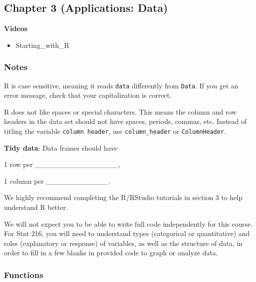\documentclass[
]{report}
\providecommand{\tightlist}{%
  \setlength{\itemsep}{0pt}\setlength{\parskip}{0pt}}
\newcommand{\rgi}{\hspace{24pt}}  %
\begin{document}
\hypertarget{chapter-3-applications-data}{%
\subsection*{Chapter 3 (Applications: Data)}\label{chapter-3-applications-data}}

\textbf{Videos}

\begin{itemize}
\tightlist
\item
  Starting\_with\_R
\end{itemize}


\hypertarget{notes-3}{%
\subsubsection*{Notes}\label{notes-3}}

R is case sensitive, meaning it reads \texttt{data} differently from \texttt{Data}. If you get an error message, check that your capitalization is correct.

R does not like spaces or special characters. This means the column and row headers in the data set should not have spaces, periods, commas, etc. Instead of titling the variable \texttt{column\ header}, use \texttt{column\_header} or \texttt{ColumnHeader}.

\textbf{Tidy data}: Data frames should have

\rgi 1 row per \_\_\_\_\_\_\_\_\_\_\_\_\_\_\_\_,

\rgi 1 column per \_\_\_\_\_\_\_\_\_\_\_\_.

We highly recommend completing the R/RStudio tutorials in section 3 to help understand R better.

We will not expect you to be able to write full code independently for this course. For Stat 216, you will need to understand types (categorical or quantitative) and roles (explanatory or response) of variables, as well as the structure of data, in order to fill in a few blanks in provided code to graph or analyze data.

\hypertarget{functions}{%
\subsubsection*{Functions}\label{functions}}
\end{document}
